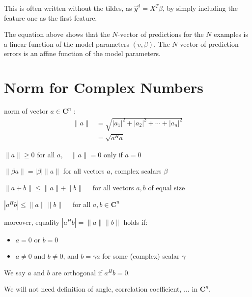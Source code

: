  This is often written without the tildes, as $ \hat{y}^{\mathrm{d}}=X^{T} \beta $, by simply including the feature one as the first feature.

The equation above shows that the $ N $-vector of predictions for the $ N $ examples is a linear function of the model parameters $ (v, \beta) $. The $ N $-vector of prediction errors is an affine function of the model parameters.


\section{Norm for Complex Numbers}

\begin{definition}
    norm of vector $ a \in \mathbf{C}^{n} $ :
$$
\begin{aligned}
\|a\| &=\sqrt{\left|a_{1}\right|^{2}+\left|a_{2}\right|^{2}+\cdots+\left|a_{n}\right|^{2}} \\
&=\sqrt{a^{H} a}
\end{aligned}
$$
\end{definition}

\begin{theorem}
$ \|a\| \geq 0 $ for all $ a, \quad\|a\|=0  $ only if $ a=0 $
\end{theorem}

\begin{theorem}
    [Homogeneous]
$ \|\beta a\|=|\beta|\|a\| $ for all vectors $ a $, complex scalars $ \beta $
\end{theorem}

\begin{theorem}
$ \|a+b\| \leq\|a\|+\|b\| \quad $ for all vectors $ a, b $ of equal size
\end{theorem}

\begin{theorem}
    $ \left|a^{H} b\right| \leq\|a\|\|b\| \quad $ for all $ a, b \in \mathbf{C}^{n} $

    moreover, equality $ \left|a^{H} b\right|=\|a\|\|b\| $ holds if:

    \begin{itemize}
        \item $ a=0 $ or $ b=0 $
        \item $ a \neq 0 $ and $ b \neq 0 $, and $ b=\gamma a $ for some (complex) scalar $ \gamma $
    \end{itemize}
\end{theorem}

We say $ a $ and $ b $ are orthogonal if $ a^{H} b=0 $.

We will not need definition of angle, correlation coefficient, $ \ldots $ in $ \mathbf{C}^{n} $.
